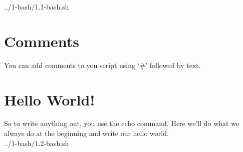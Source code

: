 
{../1-bash/1.1-bash.sh}

\section{Comments}

You can add comments to you script using `\#' followed by text.\\

\section{Hello World!}

So to write anything out, you use the echo command. Here we'll do what we always do at the beginning
and write our hello world.\\


{../1-bash/1.2-bash.sh}